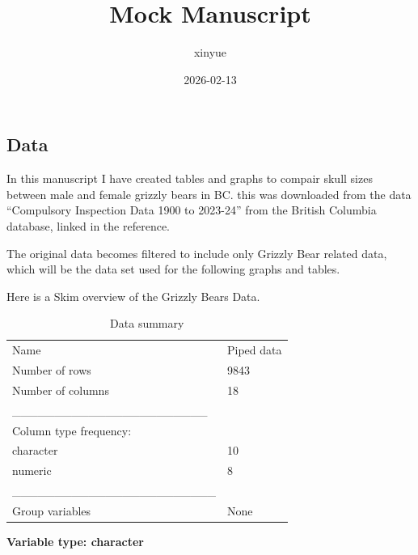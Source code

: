 \documentclass[
]{article}
\title{Mock Manuscript}
\author{xinyue}
\date{2026-02-13}
\begin{document}
\maketitle

\subsection{Data}\label{data}

In this manuscript I have created tables and graphs to compair skull
sizes between male and female grizzly bears in BC. this was downloaded
from the data ``Compulsory Inspection Data 1900 to 2023-24'' from the
British Columbia database, linked in the reference.

The original data becomes filtered to include only Grizzly Bear related
data, which will be the data set used for the following graphs and
tables.

Here is a Skim overview of the Grizzly Bears Data.

\begin{longtable}[]{@{}ll@{}}
\caption{Data summary}\tabularnewline
\toprule\noalign{}
\endfirsthead
\endhead
\bottomrule\noalign{}
\endlastfoot
Name & Piped data \\
Number of rows & 9843 \\
Number of columns & 18 \\
\_\_\_\_\_\_\_\_\_\_\_\_\_\_\_\_\_\_\_\_\_\_\_ & \\
Column type frequency: & \\
character & 10 \\
numeric & 8 \\
\_\_\_\_\_\_\_\_\_\_\_\_\_\_\_\_\_\_\_\_\_\_\_\_ & \\
Group variables & None \\
\end{longtable}

\textbf{Variable type: character}
\end{document}
